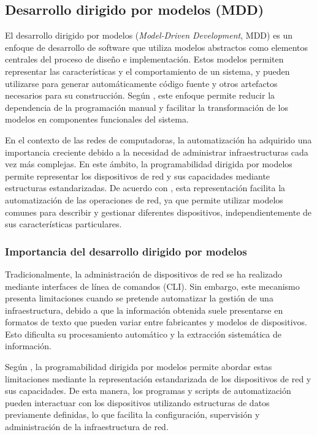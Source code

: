\documentclass[12pt,a4paper]{article}
\begin{document}
\subsection{Desarrollo dirigido por modelos (MDD)}

El desarrollo dirigido por modelos (\textit{Model-Driven Development}, MDD) es un enfoque de desarrollo de software que utiliza modelos abstractos como elementos centrales del proceso de diseño e implementación. Estos modelos permiten representar las características y el comportamiento de un sistema, y pueden utilizarse para generar automáticamente código fuente y otros artefactos necesarios para su construcción. Según \textcite{valera2026}, este enfoque permite reducir la dependencia de la programación manual y facilitar la transformación de los modelos en componentes funcionales del sistema.

En el contexto de las redes de computadoras, la automatización ha adquirido una importancia creciente debido a la necesidad de administrar infraestructuras cada vez más complejas. En este ámbito, la programabilidad dirigida por modelos permite representar los dispositivos de red y sus capacidades mediante estructuras estandarizadas. De acuerdo con \textcite{nguyen2023}, esta representación facilita la automatización de las operaciones de red, ya que permite utilizar modelos comunes para describir y gestionar diferentes dispositivos, independientemente de sus características particulares.

\subsubsection{Importancia del desarrollo dirigido por modelos}

Tradicionalmente, la administración de dispositivos de red se ha realizado mediante interfaces de línea de comandos (CLI). Sin embargo, este mecanismo presenta limitaciones cuando se pretende automatizar la gestión de una infraestructura, debido a que la información obtenida suele presentarse en formatos de texto que pueden variar entre fabricantes y modelos de dispositivos. Esto dificulta su procesamiento automático y la extracción sistemática de información.

Según \textcite{nguyen2023}, la programabilidad dirigida por modelos permite abordar estas limitaciones mediante la representación estandarizada de los dispositivos de red y sus capacidades. De esta manera, los programas y scripts de automatización pueden interactuar con los dispositivos utilizando estructuras de datos previamente definidas, lo que facilita la configuración, supervisión y administración de la infraestructura de red.
\end{document}
